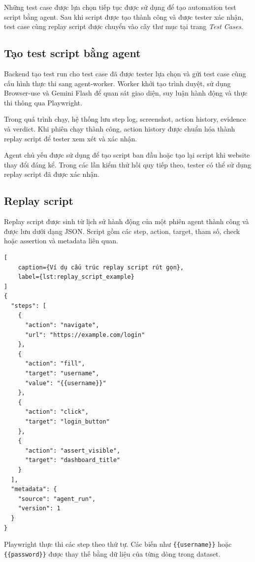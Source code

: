 Những test case được lựa chọn tiếp tục được sử dụng để tạo automation test script bằng agent. Sau khi script được tạo thành công và được tester xác nhận, test case cùng replay script được chuyển vào cây thư mục tại trang \textit{Test Cases}.

\subsection{Tạo test script bằng agent}

Backend tạo test run cho test case đã được tester lựa chọn và gửi test case cùng cấu hình thực thi sang agent-worker. Worker khởi tạo trình duyệt, sử dụng Browser-use và Gemini Flash để quan sát giao diện, suy luận hành động và thực thi thông qua Playwright.

Trong quá trình chạy, hệ thống lưu step log, screenshot, action history, evidence và verdict. Khi phiên chạy thành công, action history được chuẩn hóa thành replay script để tester xem xét và xác nhận.

Agent chủ yếu được sử dụng để tạo script ban đầu hoặc tạo lại script khi website thay đổi đáng kể. Trong các lần kiểm thử hồi quy tiếp theo, tester có thể sử dụng replay script đã được xác nhận.

\subsection{Replay script}

Replay script được sinh từ lịch sử hành động của một phiên agent thành công và được lưu dưới dạng JSON. Script gồm các step, action, target, tham số, check hoặc assertion và metadata liên quan.

\begin{lstlisting}[
    caption={Ví dụ cấu trúc replay script rút gọn},
    label={lst:replay_script_example}
]
{
  "steps": [
    {
      "action": "navigate",
      "url": "https://example.com/login"
    },
    {
      "action": "fill",
      "target": "username",
      "value": "{{username}}"
    },
    {
      "action": "click",
      "target": "login_button"
    },
    {
      "action": "assert_visible",
      "target": "dashboard_title"
    }
  ],
  "metadata": {
    "source": "agent_run",
    "version": 1
  }
}
\end{lstlisting}

Playwright thực thi các step theo thứ tự. Các biến như \texttt{\{\{username\}\}} hoặc \texttt{\{\{password\}\}} được thay thế bằng dữ liệu của từng dòng trong dataset.

